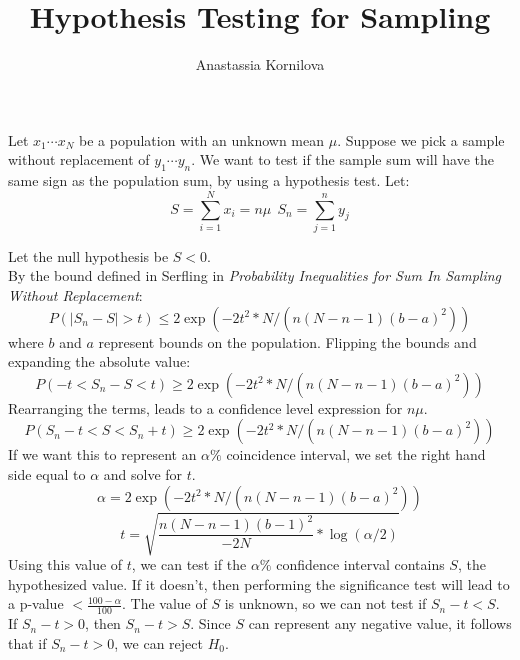 \documentclass[12pt]{article}
\begin{document}
\title{Hypothesis Testing for Sampling}
\author{Anastassia Kornilova}
\date{}
\maketitle

Let $x_1 \cdots x_N$ be a population with an unknown mean $\mu$. Suppose we pick a sample without replacement of $y_1 \cdots y_n$. We want to test if the sample sum will have the same sign as the population sum, by using a hypothesis test. Let:
$$S = \sum_{i=1}^N x_i = n\mu \ \  S_n = \sum_{j=1}^n y_j$$

Let the null hypothesis be $S < 0 $.\\
By the bound defined in Serfling in {\it Probability Inequalities for Sum In Sampling Without Replacement}:
$$ P( | S_n - S | > t ) \leq 2  \exp(-2 t^2 * N/ (n (N-n-1)(b-a)^2)) $$
where $b$ and $a$ represent bounds on the population. Flipping the bounds and expanding the absolute value:
$$ P( -t < S_n - S < t ) \geq 2  \exp(-2 t^2 * N/ (n (N-n-1)(b-a)^2)) $$
Rearranging the terms, leads to a confidence level expression for $n\mu$.
$$ P(S_n - t < S < S_n + t) \geq 2  \exp(-2 t^2 * N/ (n (N-n-1)(b-a)^2)) $$
If we want this to represent an $\alpha \% $ coincidence interval, we set the right hand side equal to $\alpha$ and solve for $t$.
$$ \alpha = 2  \exp(-2 t^2 * N/ (n (N-n-1)(b-a)^2))$$
$$ t = \sqrt{\frac{n (N-n-1)(b-1)^2}{-2N} * \log(\alpha/2)}$$
Using this value of $t$, we can test if the $\alpha \%$ confidence interval contains $S$, the hypothesized value. If it doesn't, then performing the significance test will lead to a p-value $< \frac{100 - \alpha}{100}$. The value of $S$ is unknown, so we can not test if $S_n - t < S$. If $S_n - t > 0$, then $S_n - t > S$. Since $S$ can represent any negative value, it follows that if $S_n - t > 0$, we can reject $H_0$.
\end{document}
